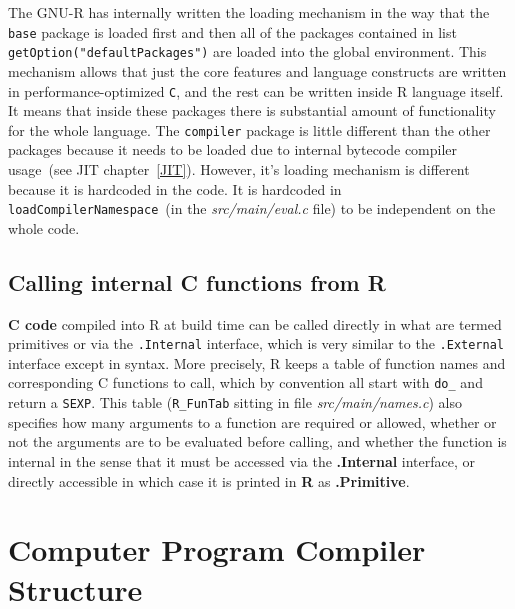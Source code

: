 \documentclass[thesis=M,english]{FITthesis}[2018/10/20]
\newcommand{\code}[1]{\texttt{#1}}
\begin{document}
The GNU-R has internally written the loading mechanism in the way that the \code{base} package is loaded first and then all of the packages contained in list \code{getOption("defaultPackages")} are loaded into the global environment. This mechanism allows that just the core features and language constructs are written in performance-optimized \code{C}, and the rest can be written inside R language itself. It means that inside these packages there is substantial amount of functionality for the whole language. The \code{compiler} package is little different than the other packages because it needs to be loaded due to internal bytecode compiler usage~(see JIT chapter~\ref{JIT}). However, it's loading mechanism is different because it is hardcoded in the code. It is hardcoded in \code{loadCompilerNamespace}~(in the \textit{src/main/eval.c} file) to be independent on the whole code.


\subsection{Calling internal C functions from R}


\textbf{C code} compiled into R at build time can be called directly in what are termed primitives or via the \code{.Internal} interface, which is very similar to the \code{.External} interface except in syntax. More precisely, R keeps a table of function names and corresponding C functions to call, which by convention all start with \code{do{\_}} and return a \code{SEXP}. This table (\code{R{\_}FunTab} sitting in file \textit{src/main/names.c}) also specifies how many arguments to a function are required or allowed, whether or not the arguments are to be evaluated before calling, and whether the function is internal in the sense that it must be accessed via the \textbf{.Internal} interface, or directly accessible in which case it is printed in \textbf{R} as \textbf{.Primitive}.

\section{Computer Program Compiler Structure}

\end{document}
